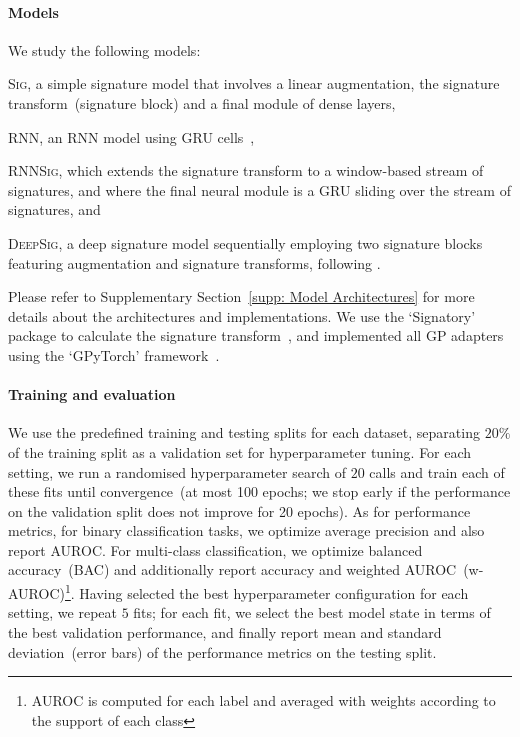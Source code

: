 \documentclass{article}
\begin{document}
\paragraph{Models}
%
We study the following models:
\begin{inparaenum}[(1)]
  \item \textsc{Sig}, a simple signature model that involves a linear
    augmentation, the signature transform~(signature block) and a final
    module of dense layers,
  \item \textsc{RNN}, an RNN model using GRU cells~\citep{cho2014learning},
  \item \textsc{RNNSig}, which extends the signature transform to a window-based
    stream of signatures, and where the final neural module is a GRU
    sliding over the stream of signatures, and
  \item \textsc{DeepSig}, a deep signature model sequentially employing two signature blocks featuring augmentation and signature transforms,
  following \citet{kidger2019deep}.
\end{inparaenum}
%
Please refer to Supplementary Section~\ref{supp: Model Architectures} for more details about the
architectures and implementations. We use the `Signatory' package to
calculate the signature transform~\citep{signatory}, and implemented all GP
adapters using the `GPyTorch' framework~\citep{gardner2018gpytorch}.

\paragraph{Training and evaluation}
%
We use the predefined training and testing splits for each dataset,
separating $20\%$ of the training split as a validation set for
hyperparameter tuning.
%
For each setting, we run a randomised hyperparameter search of $20$
calls and train each of these fits until convergence~(at most 100
epochs; we stop early if the performance on the validation
split does not improve for 20 epochs). As for performance metrics, for
binary classification tasks, we optimize average precision and also report AUROC. For multi-class
classification, we optimize balanced accuracy~(BAC) and additionally
report accuracy and weighted AUROC~(w-AUROC)\footnote{%
  AUROC is computed for each label and averaged with weights according to
  the support of each class%
}.
%
Having selected the best hyperparameter configuration for each setting,
we repeat $5$ fits; for each fit, we select the best model state in
terms of the best validation performance, and finally report mean and
standard deviation~(error bars) of the performance metrics on the
testing split.
\end{document}

